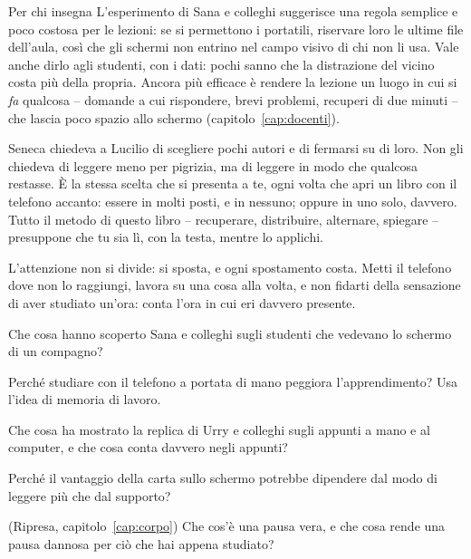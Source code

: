 \begin{riquadro}{Per chi insegna}
L'esperimento di Sana e colleghi suggerisce una regola semplice e poco
costosa per le lezioni: se si permettono i portatili, riservare loro le
ultime file dell'aula, così che gli schermi non entrino nel campo visivo
di chi non li usa. Vale anche dirlo agli studenti, con i dati: pochi
sanno che la distrazione del vicino costa più della propria. Ancora più
efficace è rendere la lezione un luogo in cui si \emph{fa} qualcosa --
domande a cui rispondere, brevi problemi, recuperi di due minuti -- che
lascia poco spazio allo schermo (capitolo~\ref{cap:docenti}).
\end{riquadro}

\asterismo

Seneca chiedeva a Lucilio di scegliere pochi autori e di fermarsi su
di loro. Non gli chiedeva di leggere meno per pigrizia, ma di leggere in
modo che qualcosa restasse. È la stessa scelta che si presenta a te,
ogni volta che apri un libro con il telefono accanto: essere in molti
posti, e in nessuno; oppure in uno solo, davvero. Tutto il metodo di
questo libro -- recuperare, distribuire, alternare, spiegare -- presuppone
che tu sia lì, con la testa, mentre lo applichi.

\begin{daricordare}
L'attenzione non si divide: si sposta, e ogni spostamento costa. Metti
il telefono dove non lo raggiungi, lavora su una cosa alla volta, e
non fidarti della sensazione di aver studiato un'ora: conta l'ora in
cui eri davvero presente.
\end{daricordare}

\begin{domande}
  \item Che cosa hanno scoperto Sana e colleghi sugli studenti che
        vedevano lo schermo di un compagno?
  \item Perché studiare con il telefono a portata di mano peggiora
        l'apprendimento? Usa l'idea di memoria di lavoro.
  \item Che cosa ha mostrato la replica di Urry e colleghi sugli appunti
        a mano e al computer, e che cosa conta davvero negli appunti?
  \item Perché il vantaggio della carta sullo schermo potrebbe dipendere
        dal modo di leggere più che dal supporto?
  \item (Ripresa, capitolo~\ref{cap:corpo}) Che cos'è una pausa vera, e
        che cosa rende una pausa dannosa per ciò che hai appena
        studiato?
\end{domande}

